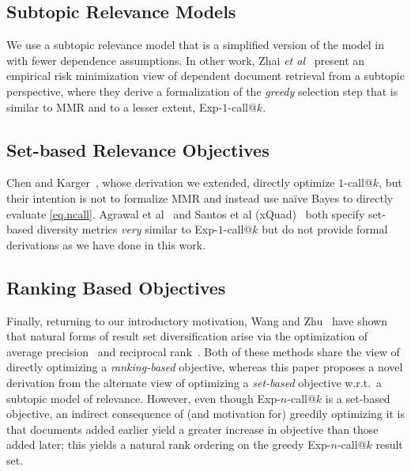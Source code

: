 \subsection{Subtopic Relevance Models} 

We use a subtopic relevance model that is a simplified version of the
model in~\cite{plmmr} with fewer dependence assumptions.  In other
work, Zhai {\it et al}~\cite{zhai03Beyond} present an empirical risk
minimization view of dependent document retrieval from a subtopic
perspective, where they derive a formalization of the
\emph{greedy} selection step that is similar to MMR and to a lesser
extent, Exp-$1$-call@$k$.

\subsection{Set-based Relevance Objectives} 

Chen and Karger~\cite{chen06Less}, whose derivation we extended,
directly optimize $1$-call@$k$, but their intention is not to
formalize MMR and instead use na\"{i}ve Bayes to directly evaluate
\eqref{eq.ncall}.  Agrawal et al~\cite{agrawal09diversifying}
and Santos et al (xQuad)~\cite{santos2010xquad} both specify set-based
diversity metrics \emph{very} similar to Exp-$1$-call@$k$ but do not provide
formal derivations as we have done in this work. 

\subsection{Ranking Based Objectives} 

Finally, returning to our introductory motivation, Wang and
Zhu~\cite{wangzhu10} have shown that natural forms of result set
diversification arise via the optimization of average
precision~\cite{ap} and reciprocal rank~\cite{mrr}.  Both of these
methods share the view of directly optimizing a
\emph{ranking-based} objective, whereas this paper proposes a novel
derivation from the alternate view of optimizing a \emph{set-based}
objective w.r.t.\ a subtopic model of relevance.  However, even though
Exp-$n$-call@$k$ is a set-based objective, an indirect consequence of
(and motivation for) greedily optimizing it is that documents added
earlier yield a greater increase in objective than those added later;
this yields a natural rank ordering on the greedy Exp-$n$-call@$k$
result set.


